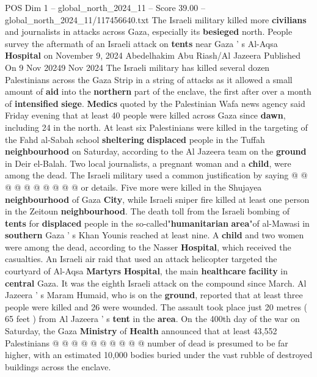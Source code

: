 \begin{textsample}{POS Dim 1 – global\_north\_2024\_11 – Score 39.00 – global\_north\_2024\_11/117456640.txt}  \label{ex:f1_pos_333}
The Israeli military killed more \textbf{civilians} and journalists in attacks across Gaza, especially its \textbf{besieged} north.
People survey the aftermath of an Israeli attack on \textbf{tents} near Gaza ' s Al-Aqsa \textbf{Hospital} on November 9, 2024 Abedelhakim Abu Riash/Al Jazeera Published On 9 Nov 20249 Nov 2024 The Israeli military has killed several dozen Palestinians across the Gaza Strip in a string of attacks as it allowed a small amount of \textbf{aid} into the \textbf{northern} part of the enclave, the first after over a month of \textbf{intensified} \textbf{siege}. \textbf{Medics} quoted by the Palestinian Wafa news agency said Friday evening that at least 40 people were killed across Gaza since \textbf{dawn}, including 24 in the north.
At least six Palestinians were killed in the targeting of the Fahd al-Sabah school \textbf{sheltering} \textbf{displaced} people in the Tuffah \textbf{neighbourhood} on Saturday, according to the Al Jazeera team on the \textbf{ground} in Deir el-Balah.
Two local journalists, a pregnant woman and a \textbf{child}, were among the dead.
The Israeli military used a common justification by saying @ @ @ @ @ @ @ @ @ @ or details.
Five more were killed in the Shujayea \textbf{neighbourhood} of Gaza \textbf{City}, while Israeli sniper fire killed at least one person in the Zeitoun \textbf{neighbourhood}.
The death toll from the Israeli bombing of \textbf{tents} for \textbf{displaced} people in the so-called"\textbf{humanitarian} \textbf{area}"of al-Mawasi in \textbf{southern} Gaza ' s Khan Younis reached at least nine.
A \textbf{child} and two women were among the dead, according to the Nasser \textbf{Hospital}, which received the casualties.
An Israeli air raid that used an attack helicopter targeted the courtyard of Al-Aqsa \textbf{Martyrs} \textbf{Hospital}, the main \textbf{healthcare} \textbf{facility} in \textbf{central} Gaza.
It was the eighth Israeli attack on the compound since March.
Al Jazeera ' s Maram Humaid, who is on the \textbf{ground}, reported that at least three people were killed and 26 were wounded.
The assault took place just 20 metres ( 65 feet ) from Al Jazeera ' s \textbf{tent} in the \textbf{area}.
On the 400th day of the war on Saturday, the Gaza \textbf{Ministry} of \textbf{Health} announced that at least 43,552 Palestinians @ @ @ @ @ @ @ @ @ @ number of dead is presumed to be far higher, with an estimated 10,000 bodies buried under the vast rubble of destroyed buildings across the enclave.

\end{textsample}
